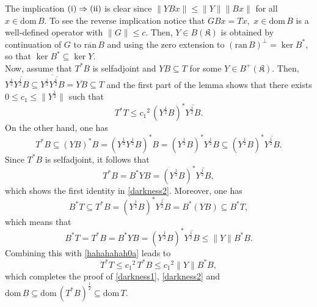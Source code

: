 \documentclass{amsart}
\makeatletter
\newcommand{\n}{\|}
\newcommand{\kk}{\mathfrak{K}}
\newcommand{\ran}{\mathrm{ran}\,}
\newcommand{\ranbar}{\overline{\mathrm{ran}}\,}
\newcommand{\D}{\mathrm{dom}\,}
\newcommand{\DB}{\mathrm{dom}\,B }
\newcommand{\adj}{^*}
\newcommand{\tstar}{T^{*}}
\newcommand{\half}{^{\frac{1}{2}}}
\newcommand{\halftsb}{( T^*B)^{\frac{1}{2}}}
\newcommand{\orth}{^\perp}
\newcommand{\inclu}{\subseteq}
\newcommand{\lplusk}{B^{+}(\kk)}
\numberwithin{equation}{section}
\renewenvironment{proof}[1][\proofname]{%
   \par\pushQED{\qed}\normalfont%
   \topsep6\p@\@plus6\p@\relax
   \trivlist\item[\hskip\labelsep\bfseries#1\@addpunct{.}]%
   \ignorespaces
}{%
   \popQED\endtrivlist\@endpefalse
}
\makeatother
\begin{document}
\begin{proof} The implication $ \rm (i) \Rightarrow (ii)$ is clear since $\n YB x \n \leq \n Y\n \n B x\n$ for all $x \in \D B.$ To see the reverse implication notice that $G B x = Tx ,$ $x \in \D B$ is a well-defined operator with $\n G \n \leq c.$ Then, $Y \in B(\kk)$ is obtained by continuation of $G$ to $\ranbar B$ and using the zero extension to $(\ran B )\orth= \ker B\adj$, so that $\ker B\adj \inclu \ker Y.$  \\
         \hspace*{0.4cm} Now, assume that $\tstar B$ is selfadjoint and $YB \inclu T$ for some $Y \in \lplusk.$
          Then, $ Y\half  \overline{Y\half B} \inclu \overline{Y\half  \overline{Y\half B}} = \overline{Y  B} \inclu T$ and the first part of the lemma shows that there exists $0 \leq c_1 \leq \n Y\half\n$  such that
       \begin{equation}\label{hahahahah0a}
       \tstar T \leq   {c_1}^2 \, ( Y\half B)\adj \overline{Y\half B}.
        \end{equation}
        On the other hand, one has
        $$
        \tstar B \inclu    (YB)^*B=
          (Y\half Y\half B)^*B=( Y\half B)^*Y\half B \inclu
        ( Y\half B)^*\overline{Y\half B}.
         $$
 Since $  \tstar B$ is selfadjoint, it follows  that
         \begin{equation}
            \tstar B = B\adj Y B= ( Y\half B)^*\overline{Y\half B},
         \end{equation}
       which shows the first identity in  \eqref{darkness2}. Moreover, one has
         $$
         B\adj T \inclu \tstar B=( Y\half B)^*\overline{Y\half B}= B\adj (Y B) \inclu B\adj T,
         $$
        which  means that
               \begin{equation*}
              B\adj T =\tstar B=  B\adj Y B =   ( Y\half B)^*\overline{Y\half B} \leq \n Y \n B\adj B.
         \end{equation*}
       Combining this with   \eqref{hahahahah0a} leads to
        $$
        \tstar T \leq  {c_1}^2 \, \tstar B \leq {c_1}^2 \n Y\n B\adj B,
        $$
        which completes the proof of \eqref{darkness1}, \eqref{darkness2}   and $\DB   \inclu \D \halftsb \inclu \D T.$
\end{proof}
\end{document}
